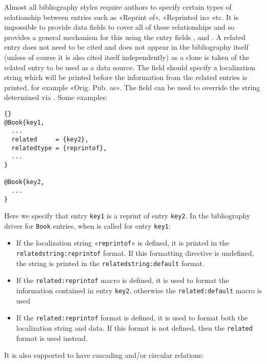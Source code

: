 \documentclass{ltxdockit}[2011/03/25]
\begin{document}
Almost all bibliography styles require authors to specify certain types of relationship between entries such as «Reprint of», «Reprinted in» etc. It is impossible to provide data fields to cover all of these relationships and so  provides a general mechanism for this using the entry fields ,  and . A related entry does not need to be cited and does not appear in the bibliography itself (unless of course it is also cited itself independently) as a clone is taken of the related entry to be used as a data source. The  field should specify a localization string which will be printed before the information from the related entries is printed, for example «Orig. Pub. as». The  field can be used to override the string determined via . Some examples:

\begin{lstlisting}[style=bibtex]{}
@Book{key1,
  ...
  related     = {key2},
  relatedtype = {reprintof},
  ...
}

@Book{key2,
  ...
}
\end{lstlisting}
%
Here we specify that entry \texttt{key1} is a reprint of entry \texttt{key2}. In the bibliography driver for \texttt{Book} entries, when  is called for entry \texttt{key1}:

\begin{itemize}
\item If the localization string «\texttt{reprintof}» is defined, it is printed in the \texttt{relatedstring:reprintof} format. If this formatting directive is undefined, the string is printed in the \texttt{relatedstring:default} format.
\item If the \texttt{related:reprintof} macro is defined, it is used to format the information contained in entry \texttt{key2}, otherwise the \texttt{related:default} macro is used
\item If the \texttt{related:reprintof} format is defined, it is used to format both the localization string and data. If this format is not defined, then the \texttt{related} format is used instead.
\end{itemize}
%
It is also supported to have cascading and/or circular relations:
\end{document}

